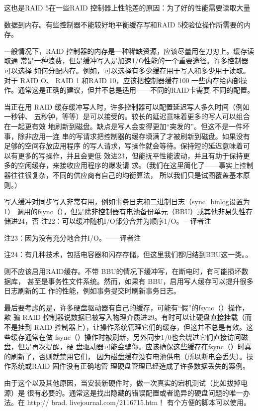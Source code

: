 这也是RAID 5在一些RAID 控制器上性能差的原因：为了好的性能需要读取大量

数据到内存。有些控制器不能较好地平衡缓存写和RAID 5校验位操作所需要的内存。

一般情况下，RAID 控制器的内存是一种稀缺资源，应该尽量用在刀刃上。缓存读取通
常是一种浪费，但是缓冲写入是加速1/O性能的一个重要途径。许多控制器可以选择
如何分配内存。例如，可以选择有多少缓存用于写人和多少用于读取。对于 RAID O、
RAID 1 和RAID 10，应该把控制器缓存100%
一些内存给内部操作。通常这是正确的建议，但并不总是适用——不同的RAID卡需要
不同的配置。

当正在用 RAID 缓存缓冲写人时，许多控制器可以配置延迟写人多久时间（例如一秒钟、
五秒钟，等等）是可以接受的。较长的延迟意味着更多的写人可以组合在一起更有效
地刷新到磁盘。缺点是写人会变得更加“突发的”。但这不是一件坏事，除非应用一连
串的写请求把控制器的缓存填满了才被刷新到磁盘。如果没有足够的空间存放应用程序
的写人请求，写操作就会等待。保持短的延迟意味着可以有更多的写操作，并且会更低
效进23，但能抚平性能波动，并且有助于保持更多的空闲缓存，来接收应用程序的爆发请
求。（我们在这里简化了——事实上控制器往往很复杂，不同的供应商有自己的均衡算法，
所以我们只是试图覆盖基本原则。）

写人缓冲对同步写入非常有用，例如事务日志和二进制日志（sync\_binlog设置为1）
调用的fsync（），但是除非控制器有电池备份单元（BBU）或其他非易失性存储进24，否
注22：可以缓冲随机I/O部分合并为顺序1/O。—译者注

注23：因为没有充分地合并I/O。——译者注

注24：有几种技术，包括电容器和闪存存储，但这里我们都归结到BBU这一类。。

则不应该启用RAID缓存。不带 BBU的情况下缓冲写，在断电时，有可能损坏数据库，
甚至是事务性文件系统。然而，如果有 BBU，启用写人缓存可以提升很多日志刷新的工
作的性能，例如事务提交时刷新事务日志。

最后要考虑的是，许多硬盘驱动器有自己的缓存，可能有“假”的fsync（）操作，欺
骗 RAID 控制器说数据已被写入物理介质进29。有时可以让硬盘直接挂载（而不是挂到
RAID 控制器上），让操作系统管理它们的缓存，但这并不总是有效。这些缓存通常在做
fsync（）操作时被刷新，另外同步1/0也会绕过它们直接访问磁盘，但是再次提醒，硬
盘驱动器可能会骗你。应该确保这些缓存在fsync（）时真的刷新了，否则就禁用它们，
因为磁盘缓存没有电池供电（所以断电会丢失）。操作系统或RAID 固件没有正确地管
理硬盘管理已经造成了许多数据丢失的案例。

由于这个以及其他原因，当安装新硬件时，做一次真实的宕机测试（比如拔掉电源）是
很有必要的。通常这是找出隐藏的错误配置或者诡异的硬盘问题的唯一办法。在 http://
brad. livejournal.com/2116715.htm！ 有个方便的脚本可以使用。

